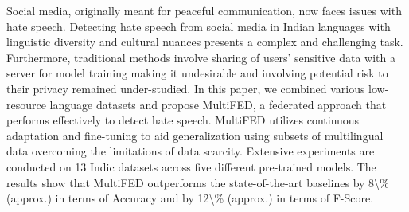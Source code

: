 Social media, originally meant for peaceful communication, now faces issues with hate speech. Detecting hate speech from social media in Indian languages with linguistic diversity and cultural nuances presents a complex and challenging task. Furthermore, traditional methods involve sharing of users' sensitive data with a server for model training making it undesirable and involving potential risk to their privacy remained under-studied. In this paper, we combined various low-resource language datasets and propose MultiFED, a federated approach that performs effectively to detect hate speech. MultiFED utilizes continuous adaptation and fine-tuning to aid generalization using subsets of multilingual data overcoming the limitations of data scarcity. Extensive experiments are conducted on 13 Indic datasets across five different pre-trained models. The results show that MultiFED outperforms the state-of-the-art baselines by 8\textbackslash{}\% (approx.) in terms of Accuracy and by 12\textbackslash{}\% (approx.) in terms of F-Score.